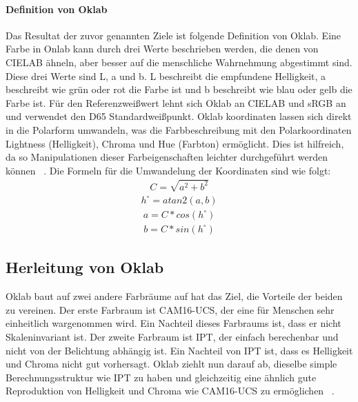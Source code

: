 \documentclass[12pt, a4paper, ngerman]{article}
\begin{document}
\paragraph{Definition von Oklab}
Das Resultat der zuvor genannten Ziele ist folgende Definition von Oklab.
Eine Farbe in Onlab kann durch drei Werte beschrieben werden, die denen von CIELAB ähneln, 
aber besser auf die menschliche Wahrnehmung abgestimmt sind.
Diese drei Werte sind L, a und b. 
L beschreibt die empfundene Helligkeit, a beschreibt wie grün oder rot die Farbe ist und b beschreibt wie blau oder gelb die Farbe ist.
Für den Referenzweißwert lehnt sich Oklab an CIELAB und sRGB an und verwendet den D65 Standardweißpunkt.
Oklab koordinaten lassen sich direkt in die Polarform umwandeln, 
was die Farbbeschreibung mit den Polarkoordinaten Lightness (Helligkeit), Chroma und Hue (Farbton) ermöglicht.
Dies ist hilfreich, da so Manipulationen dieser Farbeigenschaften leichter durchgeführt werden können ~\cite{Oklab_2020}.
Die Formeln für die Umwandelung der Koordinaten sind wie folgt:
\begin{equation}
  \begin{aligned}
    C=\sqrt{ a^2 + b^2 }
  \end{aligned}
\end{equation}
\begin{equation}
  \begin{aligned}
    h^\circ = atan2\left( a, b \right)
  \end{aligned}
\end{equation}
\begin{equation}
  \begin{aligned}
    a = C*cos\left( h^\circ \right)
  \end{aligned}
\end{equation}
\begin{equation}
  \begin{aligned}
    b = C*sin\left( h^\circ \right)
  \end{aligned}
\end{equation}


\subsection{Herleitung von Oklab}
Oklab baut auf zwei andere Farbräume auf hat das Ziel, die Vorteile der beiden zu vereinen.
Der erste Farbraum ist CAM16-UCS, der eine für Menschen sehr einheitlich wargenommen wird.
Ein Nachteil dieses Farbraums ist, dass er nicht Skaleninvariant ist.
Der zweite Farbraum ist IPT, der einfach berechenbar und nicht von der Belichtung abhängig ist.
Ein Nachteil von IPT ist, dass es Helligkeit und Chroma nicht gut vorhersagt.
Oklab ziehlt nun darauf ab, dieselbe simple Berechnungsstruktur wie IPT zu haben und 
gleichzeitig eine ähnlich gute Reproduktion von Helligkeit und Chroma wie CAM16-UCS zu ermöglichen ~\cite{Oklab_2020}.
\end{document}
